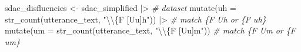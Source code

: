 \documentclass[
  letterpaper,
]{latex/krantz}
\newenvironment{Shaded}{\begin{snugshade}}{\end{snugshade}}
\newcommand{\AttributeTok}[1]{\textcolor[rgb]{0.00,0.00,0.00}{#1}}
\newcommand{\CommentTok}[1]{\textcolor[rgb]{0.00,0.00,0.00}{\textit{#1}}}
\newcommand{\FunctionTok}[1]{\textcolor[rgb]{0.00,0.00,0.00}{#1}}
\newcommand{\NormalTok}[1]{\textcolor[rgb]{0.00,0.00,0.00}{#1}}
\newcommand{\OtherTok}[1]{\textcolor[rgb]{0.00,0.00,0.00}{#1}}
\newcommand{\SpecialCharTok}[1]{\textcolor[rgb]{0.00,0.00,0.00}{#1}}
\newcommand{\StringTok}[1]{\textcolor[rgb]{0.00,0.00,0.00}{#1}}
\begin{document}
\begin{Shaded}
\begin{Highlighting}[]
\NormalTok{sdac\_disfluencies }\OtherTok{\textless{}{-}} 
\NormalTok{  sdac\_simplified }\SpecialCharTok{|\textgreater{}} \CommentTok{\# dataset}
  \FunctionTok{mutate}\NormalTok{(}\AttributeTok{uh =} \FunctionTok{str\_count}\NormalTok{(utterance\_text, }\StringTok{"}\SpecialCharTok{\textbackslash{}\textbackslash{}}\StringTok{\{F [Uu]h"}\NormalTok{)) }\SpecialCharTok{|\textgreater{}} \CommentTok{\# match \{F Uh or \{F uh\}}
  \FunctionTok{mutate}\NormalTok{(}\AttributeTok{um =} \FunctionTok{str\_count}\NormalTok{(utterance\_text, }\StringTok{"}\SpecialCharTok{\textbackslash{}\textbackslash{}}\StringTok{\{F [Uu]m"}\NormalTok{)) }\CommentTok{\# match \{F Um or \{F um\}}
\end{Highlighting}
\end{Shaded}
\end{document}
